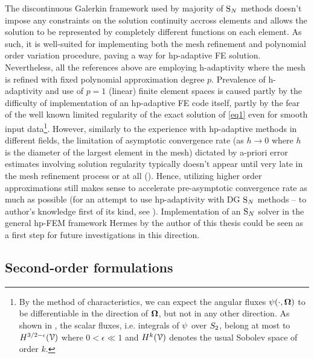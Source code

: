 The discontinuous Galerkin framework used by majority of $\text{S}_{N}$ methods doesn't impose any constraints on the solution
continuity accross elements and allows the solution to be represented by completely different functions on each element.
As such, it is well-suited for implementing both the mesh refinement and polynomial order variation procedure, paving a
way for hp-adaptive FE solution.
Nevertheless, all the references above are employing h-adaptivity where the mesh is refined with fixed polynomial
approximation degree $p$. Prevalence of h-adaptivity and use of $p=1$ (linear) finite element spaces is caused partly
by the difficulty of implementation of an hp-adaptive FE code itself, partly by the fear of the well known limited
regularity of the exact solution of \eqref{eq1} even for smooth input data\footnote{By the method of characteristics, we
can expect the angular fluxes $\psi(\cdot,\mathbf{\Omega})$ to be differentiable in the direction of $\mathbf{\Omega}$, but not in
any other direction. As shown in \cite{Johnson}, the scalar fluxes, i.e. integrals of $\psi$ over $S_2$, belong
at most to $H^{3/2-\epsilon}(\mathcal{V})$ where $0 < \epsilon \ll 1$ and $H^{k}(\mathcal{V})$ denotes the usual Sobolev space of order
$k$.}.
However, similarly to the experience with hp-adaptive methods in different fields, the limitation of asymptotic
convergence rate (as $h\to 0$ where $h$ is the diameter of the largest element in the mesh) dictated by a-priori error
estimates involving solution regularity typically doesn't appear until very late in the mesh refinement process or at
all (\cite{wang2009convergence}). Hence, utilizing higher order approximations still makes sense to accelerate
pre-asymptotic convergence rate as much as possible (for an attempt to use hp-adaptivity with DG $\text{S}_{N}$ methods -- to
author's knowledge first of its kind, see \cite{FournierDGHP}). Implementation of an $\text{S}_{N}$ solver in the general hp-FEM
framework Hermes by the author of this thesis could be seen as a first step for future investigations in this direction.





  

\subsection{Second-order formulations}\label{sec:second-order}

